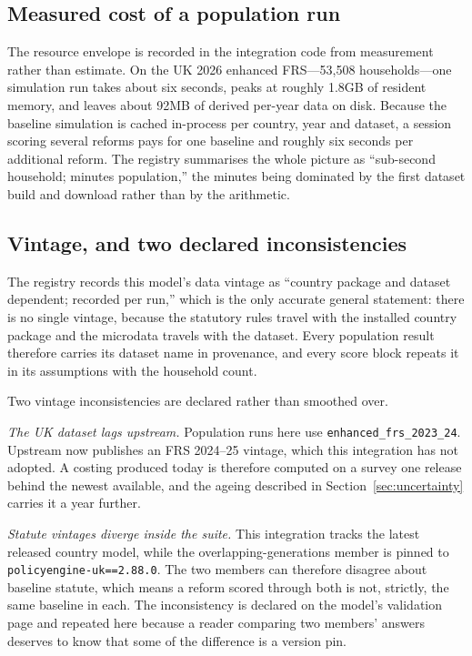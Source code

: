 \subsection{Measured cost of a population run}

The resource envelope is recorded in the integration code from measurement rather than estimate. On the UK 2026 enhanced FRS---53{,}508 households---one simulation run takes about six seconds, peaks at roughly 1.8GB of resident memory, and leaves about 92MB of derived per-year data on disk. Because the baseline simulation is cached in-process per country, year and dataset, a session scoring several reforms pays for one baseline and roughly six seconds per additional reform. The registry summarises the whole picture as ``sub-second household; minutes population,'' the minutes being dominated by the first dataset build and download rather than by the arithmetic.

\subsection{Vintage, and two declared inconsistencies}

The registry records this model's data vintage as ``country package and dataset dependent; recorded per run,'' which is the only accurate general statement: there is no single vintage, because the statutory rules travel with the installed country package and the microdata travels with the dataset. Every population result therefore carries its dataset name in provenance, and every score block repeats it in its assumptions with the household count.

Two vintage inconsistencies are declared rather than smoothed over.

\emph{The UK dataset lags upstream.} Population runs here use \texttt{enhanced\_frs\_2023\_24}. Upstream now publishes an FRS 2024--25 vintage, which this integration has not adopted. A costing produced today is therefore computed on a survey one release behind the newest available, and the ageing described in Section~\ref{sec:uncertainty} carries it a year further.

\emph{Statute vintages diverge inside the suite.} This integration tracks the latest released country model, while the overlapping-generations member is pinned to \texttt{policyengine-uk==2.88.0}. The two members can therefore disagree about baseline statute, which means a reform scored through both is not, strictly, the same baseline in each. The inconsistency is declared on the model's validation page and repeated here because a reader comparing two members' answers deserves to know that some of the difference is a version pin.

